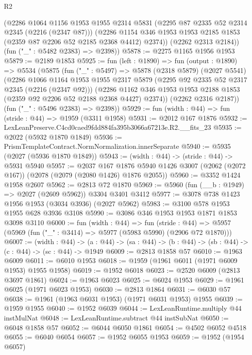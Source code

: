 \begin{lexlean}{R2}
\begin{coremodule}
        (@2286
          @1064
          @1156
          @1953
          @1955
          @2314
          @5831
          (@2295 @87 @2335 @52 @2314 @2345 (@2216 (@2347 @87)))
          (@2286 @1154 @346 @1953 @1953 @2185 @1853 (@2359 @87 @2206 @52 @2185 @2368 @4412) @2374))
        (@2262 @2313 @2184))
      (fun ("_" : @5482 @2383) => @2398))
@5878 := @2275 @1165 @1956 @1953
@5879 := @2189 @1853
@5925 := fun (left : @1890) =>
  fun (output : @1890) =>
  @5534
    (@5875
      (fun ("_" : @5497) =>
      @5878
        (@2318 @5879)
        (@2027 @5541)
        (@2286
          @1066
          @1164
          @1953
          @1955
          @2317
          @5879
          (@2295 @92 @2335 @52 @2317 @2345 (@2216 (@2347 @92)))
          (@2286 @1162 @346 @1953 @1953 @2188 @1853 (@2359 @92 @2206 @52 @2188 @2368 @4427) @2374))
        (@2262 @2316 @2187))
      (fun ("_" : @5496 @2383) => @2398))
@5929 := fun (width : @44) => fun (stride : @44) => @1959 (@3311 @1958)
@5931 := @2012 @167 @1876
@5932 := LexLeanPreserve.C4cd0caed9fdd884fa395b3066a67213e.R2.__fits_23
@5935 := @2022 (@5932 @1870 @1849)
@5936 := PrismTemplateContract.NormNormalization.innerSeparate
@5940 := @5935 (@2027 (@5936 @1870 @1849))
@5943 := (width : @44) -> (stride : @44) -> @5931 @5940
@5957 := @2037
    @167
    @1876
    @5940
    @1426
    @3007
    (@2062 (@2072 @167))
    (@2078 (@2079 (@2080 @1426) @1876 @2055))
@5960 := @3352 @1424 @1958 @2607
@5962 := @2813 @72 @1870
@5969 := @5960 (fun (__b : @1949) => @2027 (@2609 @5962)) @3304 @3401 @3412
@5977 := @3078 @738 @1423 @1956 @1953 (@3034 @3936) (@2027 @5962)
@5983 := @3100 @578 @1953 @1955 @628 @3936 @3108
@5990 := @3086 @346 @1953 @1953 @1871 @1853 @3098 @3110
@6000 := fun (width : @44) =>
  fun (stride : @44) => @5957 (@5969 (fun ("_" : @3414) => @5977 (@5983 @5990) (@2906 @72 @1870)))
@6007 := (width : @44) ->
  (a : @44) -> (sa : @44) -> (b : @44) -> (sb : @44) -> (c : @44) -> (sc : @44) -> @1949
@6009 := @2813 @1858 @57
@6010 := @1963 @6009
@6011 := @6010 @1953
@6018 := @1959 (@1961 @6011 (@1971 @6009 @1953) @1955 @1958)
@6019 := @1952 @6018
@6023 := @2520 @6009 (@2813 @3697 @1861)
@6024 := @1963 @6023
@6025 := @6024 @1953
@6029 := @1961 @6025 (@1971 @6023 @1953)
@6030 := @2813 @1864
@6031 := @6030 @57
@6038 := @1961 (@1963 @6031 @1953) (@1971 @6031 @1953) @1955
@6039 := @1959 @1955
@6040 := @1952 @6039
@6044 := LexLeanRuntime.multiply @44 instMulNat
@6048 := LexLeanRuntime.subtract @44 instSubNat
@6050 := @6048 @1858 @57
@6052 := @6044 @6050 @1861
@6054 := @4502 @6052 @4518
@6055 := @6040 @6054
@6057 := @1952 @6055 @1953
@6059 := @1952 (@1954 @6057)

\end{coremodule}
\end{lexlean}
